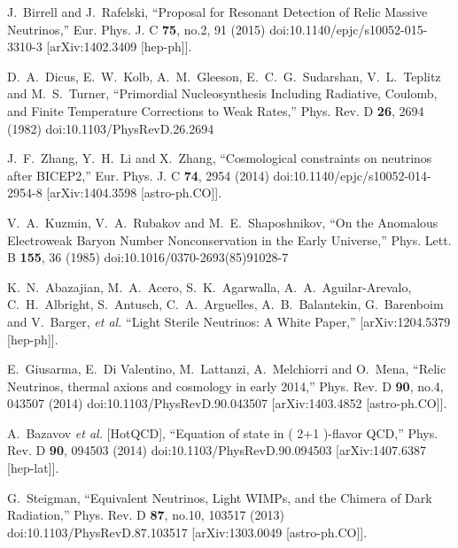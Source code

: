 \documentclass[universe,article,submit,moreauthors,pdftex,a4paper]{Definitions/mdpi}
\begin{document}
\begin{thebibliography}{99}
J.~Birrell and J.~Rafelski,
``Proposal for Resonant Detection of Relic Massive Neutrinos,''
Eur. Phys. J. C \textbf{75}, no.2, 91 (2015)
doi:10.1140/epjc/s10052-015-3310-3
[arXiv:1402.3409 [hep-ph]].

D.~A.~Dicus, E.~W.~Kolb, A.~M.~Gleeson, E.~C.~G.~Sudarshan, V.~L.~Teplitz and M.~S.~Turner,
``Primordial Nucleosynthesis Including Radiative, Coulomb, and Finite Temperature Corrections to Weak Rates,''
Phys. Rev. D \textbf{26}, 2694 (1982)
doi:10.1103/PhysRevD.26.2694

J.~F.~Zhang, Y.~H.~Li and X.~Zhang,
``Cosmological constraints on neutrinos after BICEP2,''
Eur. Phys. J. C \textbf{74}, 2954 (2014)
doi:10.1140/epjc/s10052-014-2954-8
[arXiv:1404.3598 [astro-ph.CO]].

V.~A.~Kuzmin, V.~A.~Rubakov and M.~E.~Shaposhnikov,
``On the Anomalous Electroweak Baryon Number Nonconservation in the Early Universe,''
Phys. Lett. B \textbf{155}, 36 (1985)
doi:10.1016/0370-2693(85)91028-7

K.~N.~Abazajian, M.~A.~Acero, S.~K.~Agarwalla, A.~A.~Aguilar-Arevalo, C.~H.~Albright, S.~Antusch, C.~A.~Arguelles, A.~B.~Balantekin, G.~Barenboim and V.~Barger, \textit{et al.}
``Light Sterile Neutrinos: A White Paper,''
[arXiv:1204.5379 [hep-ph]].

E.~Giusarma, E.~Di Valentino, M.~Lattanzi, A.~Melchiorri and O.~Mena,
``Relic Neutrinos, thermal axions and cosmology in early 2014,''
Phys. Rev. D \textbf{90}, no.4, 043507 (2014)
doi:10.1103/PhysRevD.90.043507
[arXiv:1403.4852 [astro-ph.CO]].

A.~Bazavov \textit{et al.} [HotQCD],
``Equation of state in ( 2+1 )-flavor QCD,''
Phys. Rev. D \textbf{90}, 094503 (2014)
doi:10.1103/PhysRevD.90.094503
[arXiv:1407.6387 [hep-lat]].

G.~Steigman,
``Equivalent Neutrinos, Light WIMPs, and the Chimera of Dark Radiation,''
Phys. Rev. D \textbf{87}, no.10, 103517 (2013)
doi:10.1103/PhysRevD.87.103517
[arXiv:1303.0049 [astro-ph.CO]].


\end{thebibliography}
\end{document}
